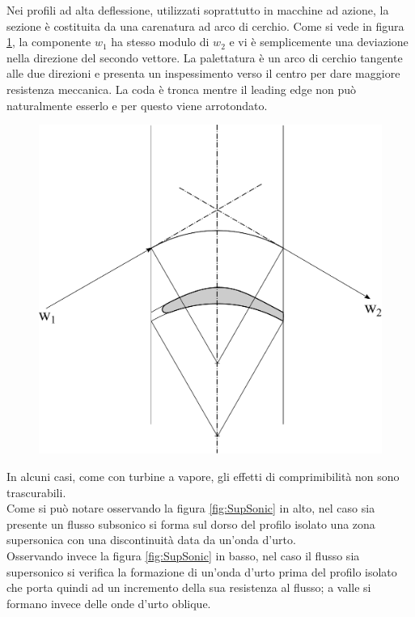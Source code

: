 Nei profili ad alta deflessione, utilizzati soprattutto in macchine ad azione, la sezione è costituita da una carenatura ad arco di cerchio. Come si vede in figura \ref{fig:palaBassaDef}, la componente $w_1$ ha stesso modulo di $w_2$ e vi è semplicemente una deviazione nella direzione del secondo vettore. La palettatura è un arco di cerchio tangente alle due direzioni e presenta un inspessimento verso il centro per dare maggiore resistenza meccanica. La coda è tronca mentre il leading edge non può naturalmente esserlo e per questo viene arrotondato. 
\begin{figure}
\centering
  \includegraphics[width=.6\textwidth]{fig/palaBassaDef.pdf}
\caption{}
\label{fig:palaBassaDef}
\end{figure}

In alcuni casi, come con turbine a vapore, gli effetti di comprimibilità non sono trascurabili.\\
Come si può notare osservando la figura \ref{fig:SupSonic} in alto, nel caso sia presente un flusso subsonico si forma sul dorso del profilo isolato una zona supersonica con una discontinuità data da un'onda d'urto.\\
Osservando invece la figura \ref{fig:SupSonic} in basso, nel caso il flusso sia supersonico si verifica la formazione di un'onda d'urto prima del profilo isolato che porta quindi ad un incremento della sua resistenza al flusso; a valle si formano invece delle onde d'urto oblique.

